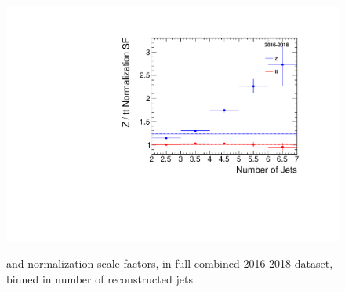 \begin{figure}[H]
       \centering
       {\includegraphics[width=\textwidth]{Images/Analysis/mumuScaleFactors_JetCount.pdf}}
       \caption{\ZJETS and \ttbar normalization scale factors, in full combined 2016-2018 dataset, binned in number of reconstructed jets}
       \label{fig:znjets}
\end{figure}

